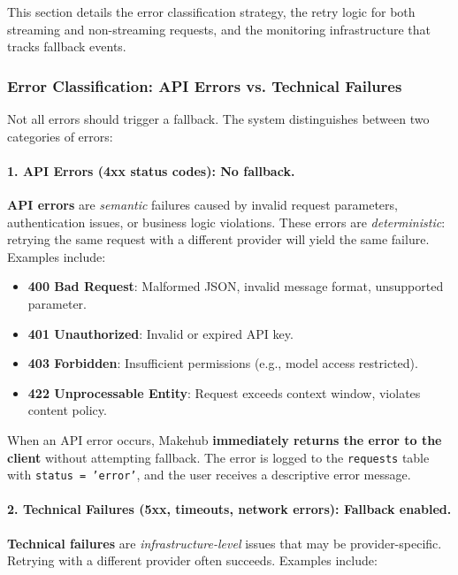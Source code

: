 \documentclass[english]{article}
\begin{document}
This section details the error classification strategy, the retry logic for both streaming and non-streaming requests, and the monitoring infrastructure that tracks fallback events.

\subsubsection{Error Classification: API Errors vs. Technical Failures}

Not all errors should trigger a fallback. The system distinguishes between two categories of errors:

\paragraph{1. API Errors (4xx status codes): No fallback.}

\textbf{API errors} are \emph{semantic} failures caused by invalid request parameters, authentication issues, or business logic violations. These errors are \emph{deterministic}: retrying the same request with a different provider will yield the same failure. Examples include:

\begin{itemize}
    \item \textbf{400 Bad Request}: Malformed JSON, invalid message format, unsupported parameter.
    \item \textbf{401 Unauthorized}: Invalid or expired API key.
    \item \textbf{403 Forbidden}: Insufficient permissions (e.g., model access restricted).
    \item \textbf{422 Unprocessable Entity}: Request exceeds context window, violates content policy.
\end{itemize}

When an API error occurs, Makehub \textbf{immediately returns the error to the client} without attempting fallback. The error is logged to the \texttt{requests} table with \texttt{status = 'error'}, and the user receives a descriptive error message.

\paragraph{2. Technical Failures (5xx, timeouts, network errors): Fallback enabled.}

\textbf{Technical failures} are \emph{infrastructure-level} issues that may be provider-specific. Retrying with a different provider often succeeds. Examples include:
\end{document}
